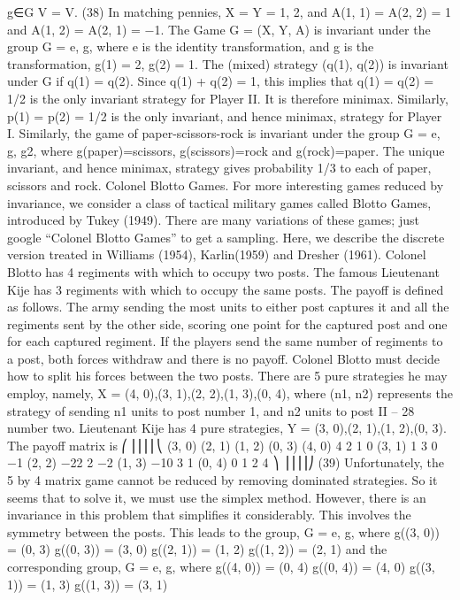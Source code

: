 \documentclass[]{report}
\begin{document}
g∈G
V = V.
(38)
In matching pennies, X = Y = {1, 2}, and A(1, 1) = A(2, 2) = 1 and A(1, 2) =
A(2, 1) = −1. The Game G = (X, Y, A) is invariant under the group G = {e, g}, where e is
the identity transformation, and g is the transformation, g(1) = 2, g(2) = 1. The (mixed)
strategy (q(1), q(2)) is invariant under G if q(1) = q(2). Since q(1) + q(2) = 1, this implies
that q(1) = q(2) = 1/2 is the only invariant strategy for Player II. It is therefore minimax.
Similarly, p(1) = p(2) = 1/2 is the only invariant, and hence minimax, strategy for Player
I.
Similarly, the game of paper-scissors-rock is invariant under the group G = {e, g, g2},
where g(paper)=scissors, g(scissors)=rock and g(rock)=paper. The unique invariant, and
hence minimax, strategy gives probability 1/3 to each of paper, scissors and rock.
Colonel Blotto Games. For more interesting games reduced by invariance, we
consider a class of tactical military games called Blotto Games, introduced by Tukey
(1949). There are many variations of these games; just google “Colonel Blotto Games”
to get a sampling. Here, we describe the discrete version treated in Williams (1954),
Karlin(1959) and Dresher (1961).
Colonel Blotto has 4 regiments with which to occupy two posts. The famous Lieutenant
Kije has 3 regiments with which to occupy the same posts. The payoff is defined as
follows. The army sending the most units to either post captures it and all the regiments
sent by the other side, scoring one point for the captured post and one for each captured
regiment. If the players send the same number of regiments to a post, both forces withdraw
and there is no payoff.
Colonel Blotto must decide how to split his forces between the two posts. There are
5 pure strategies he may employ, namely, X = {(4, 0),(3, 1),(2, 2),(1, 3),(0, 4)}, where
(n1, n2) represents the strategy of sending n1 units to post number 1, and n2 units to post
II – 28
number two. Lieutenant Kije has 4 pure strategies, Y = {(3, 0),(2, 1),(1, 2),(0, 3)}. The
payoff matrix is
⎛
⎜⎜⎜⎜⎝
(3, 0) (2, 1) (1, 2) (0, 3)
(4, 0) 4 2 1 0
(3, 1) 1 3 0 −1
(2, 2) −22 2 −2
(1, 3) −10 3 1
(0, 4) 0 1 2 4
⎞
⎟⎟⎟⎟⎠
(39)
Unfortunately, the 5 by 4 matrix game cannot be reduced by removing dominated
strategies. So it seems that to solve it, we must use the simplex method. However, there is
an invariance in this problem that simplifies it considerably. This involves the symmetry
between the posts. This leads to the group, G = {e, g}, where
g((3, 0)) = (0, 3) g((0, 3)) = (3, 0) g((2, 1)) = (1, 2) g((1, 2)) = (2, 1)
and the corresponding group, G = {e, g}, where
g((4, 0)) = (0, 4) g((0, 4)) = (4, 0) g((3, 1)) = (1, 3) g((1, 3)) = (3, 1)
\end{document}
